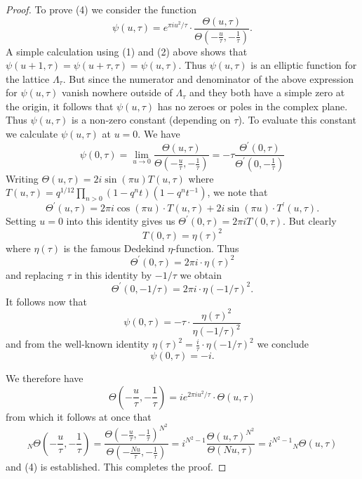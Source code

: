 \documentclass[12pt,amstex,amssymb]{article}
\theoremstyle{plain}
\theoremstyle{definition}
\begin{document}
\begin{proof}
	
	To prove (4) we consider the function
	$$
	\psi(u,\tau) = e^{\pi i u^2/\tau}\cdot\frac{\Theta(u,\tau)}{\Theta\left(-\frac{u}{\tau}, -\frac{1}{\tau}\right)}.
	$$
	A simple calculation using (1) and (2) above shows that $\psi(u+1,\tau) = \psi(u+\tau,\tau)=\psi(u,\tau)$.  Thus $\psi(u,\tau)$ is an elliptic function for the lattice $\Lambda_\tau$.
	But since the numerator and denominator of the above expression for $\psi(u,\tau)$ vanish nowhere outside of $\Lambda_\tau$ and they both have a simple zero at the origin, it follows that
	$\psi(u,\tau)$ has no zeroes or poles in the complex plane. Thus $\psi(u,\tau)$ is a non-zero constant (depending on $\tau$).   To evaluate this constant we calculate $\psi(u,\tau)$ at $u=0$.
	We have
	$$
	\psi(0,\tau) = \displaystyle  \lim_{u\to 0}\frac{\Theta(u,\tau)}{\Theta(-\tfrac{u}{\tau},-\tfrac{1}{\tau})} =\displaystyle -\tau \frac{\Theta^\prime(0,\tau)}{\Theta^\prime(0,-\tfrac{1}{\tau})}
	$$
	Writing 
	$\Theta(u,\tau)	= 2i\sin(\pi u)T(u,\tau)$ where $T(u,\tau)=q^{1/12}\prod_{n>0}(1-q^nt)(1-q^nt^{-1})$, 
	we note that 
	$$
	\Theta^\prime(u,\tau) = 2\pi i\cos(\pi u) \cdot T(u,\tau)  + 2i\sin(\pi u)\cdot T^\prime(u,\tau). 
	$$
	Setting $u=0$ into this identity gives us $\Theta^\prime(0,\tau) = 2\pi i T(0,\tau)$.
	But clearly
	$$
	T(0,\tau) = \eta(\tau)^2
	$$
	where $\eta(\tau)$ is the famous Dedekind $\eta$-function.   Thus
	$$
	\Theta^\prime(0,\tau) = 2\pi i \cdot \eta(\tau)^2  
	$$
	and replacing $\tau$ in this identity by $-1/\tau$ we obtain
	$$
	\Theta^\prime(0,-1/\tau) = 2\pi i \cdot \eta(-1/\tau)^2.
	$$
	It follows now that
	$$
	\psi(0,\tau) = -\tau\cdot\frac{\eta(\tau)^2}{\eta(-1/\tau)^2}
	$$
	and from the well-known identity
	$\eta(\tau)^2 = \frac{i}{\tau} \cdot\eta(-1/\tau)^2$
	we conclude 
	$$
	\psi(0,\tau) = -i.
	$$
	
	We therefore have
	$$
	\Theta\left(-\frac{u}{\tau}, -\frac{1}{\tau}\right) = i e^{2\pi i u^2/\tau} \cdot \Theta(u,\tau)
	$$
	from which it follows at once that
	$$
	_{N}\!\Theta\left(-\frac{u}{\tau}, -\frac{1}{\tau}\right) = \frac{\Theta\left(-\frac{u}{\tau}, -\frac{1}{\tau}\right)^{N^2}} {\Theta\left(-\frac{Nu}{\tau}, -\frac{1}{\tau}\right)} 
	= i^{N^2-1} \frac{\Theta(u,\tau)^{N^2}}{\Theta(Nu,\tau)}  = {i^{N^2-1}} _{N}\!\Theta(u,\tau)
	$$
	and (4) is established.  This completes the proof.
	
\end{proof}
\end{document}
